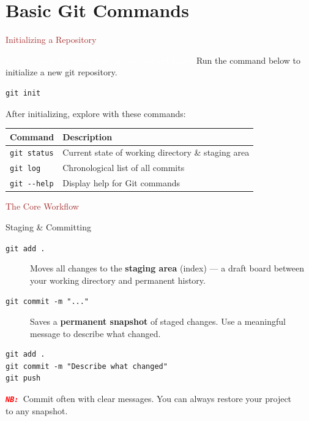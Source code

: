 
\section{Basic Git Commands}

\begin{frame}[fragile]{\textcolor{brown}{Initializing a Repository}}
\begin{block}{\textcolor{white}{Create a new Git repository in your project folder}}
Run the command below to initialize a new git repository.
\begin{lstlisting}[style=gitcode]
git init
\end{lstlisting}

  \vspace{0.4em}
  After initializing, explore with these commands:

  \begin{center}
    \begin{tabular}{ll}
      \hline
      \textbf{Command} & \textbf{Description} \\
      \hline
      \texttt{git status}  & Current state of working directory \& staging area \\
      \texttt{git log}     & Chronological list of all commits \\
      \texttt{git {-}{-}help}  & Display help for Git commands \\
      \hline
    \end{tabular}
  \end{center}
\end{block}
\end{frame}

\begin{frame}[fragile]{\textcolor{brown}{The Core Workflow}}
  \begin{block}{Staging \& Committing}
    \begin{description}
      \item[\texttt{git add .}] Moves all changes to the \textbf{staging area} (index) — a draft board between your working directory and permanent history.
      \item[\texttt{git commit -m "..."}] Saves a \textbf{permanent snapshot} of staged changes. Use a meaningful message to describe what changed.
    \end{description}
  \end{block}

\begin{lstlisting}[style=gitcode]
git add .
git commit -m "Describe what changed"
git push
\end{lstlisting}

\emph{\texttt{\textbf{\textcolor{red}{NB: }}}}Commit often with clear messages. You can always restore your project\\[4pt]
to any snapshot.
\end{frame}